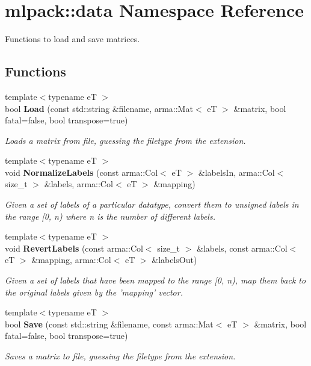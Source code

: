 \section{mlpack\-:\-:data Namespace Reference}
\label{namespacemlpack_1_1data}


Functions to load and save matrices.  


\subsection*{Functions}
\begin{DoxyCompactItemize}
\item 
{\footnotesize template$<$typename e\-T $>$ }\\bool {\bf Load} (const std\-::string \&filename, arma\-::\-Mat$<$ e\-T $>$ \&matrix, bool fatal=false, bool transpose=true)
\begin{DoxyCompactList}\small\item\em Loads a matrix from file, guessing the filetype from the extension. \end{DoxyCompactList}\item 
{\footnotesize template$<$typename e\-T $>$ }\\void {\bf Normalize\-Labels} (const arma\-::\-Col$<$ e\-T $>$ \&labels\-In, arma\-::\-Col$<$ size\-\_\-t $>$ \&labels, arma\-::\-Col$<$ e\-T $>$ \&mapping)
\begin{DoxyCompactList}\small\item\em Given a set of labels of a particular datatype, convert them to unsigned labels in the range [0, n) where n is the number of different labels. \end{DoxyCompactList}\item 
{\footnotesize template$<$typename e\-T $>$ }\\void {\bf Revert\-Labels} (const arma\-::\-Col$<$ size\-\_\-t $>$ \&labels, const arma\-::\-Col$<$ e\-T $>$ \&mapping, arma\-::\-Col$<$ e\-T $>$ \&labels\-Out)
\begin{DoxyCompactList}\small\item\em Given a set of labels that have been mapped to the range [0, n), map them back to the original labels given by the 'mapping' vector. \end{DoxyCompactList}\item 
{\footnotesize template$<$typename e\-T $>$ }\\bool {\bf Save} (const std\-::string \&filename, const arma\-::\-Mat$<$ e\-T $>$ \&matrix, bool fatal=false, bool transpose=true)
\begin{DoxyCompactList}\small\item\em Saves a matrix to file, guessing the filetype from the extension. \end{DoxyCompactList}\end{DoxyCompactItemize}


